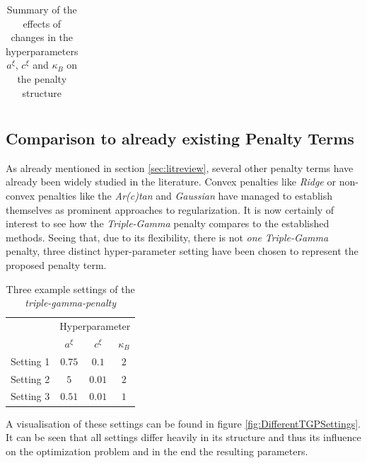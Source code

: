 \documentclass[12pt,a4paper]{article}
\begin{document}
\begin{landscape}
\begin{table}[h!]
\begin{tabular}{lcccccc}
\end{tabular}
\caption{Summary of the effects of changes in the hyperparameters $a^\xi$, $c^\xi$ and $\kappa_B$ on the penalty structure}
\label{tab:VariationsInHyperparameters}
\end{table}
\end{landscape}

\newpage

\subsection{Comparison to already existing Penalty Terms}\label{subsec:comparepenalties}

As already mentioned in section \ref{sec:litreview}, several other penalty terms have already been widely studied in the literature. Convex penalties like \textit{Ridge} \parencite{HoerlKennard1970a} or non-convex penalties like the \textit{Ar(c)tan} \parencite{WangZhu2016} and \textit{Gaussian} \parencite{JohnVettamWu2022} have managed to establish themselves as prominent approaches to regularization. It is now certainly of interest to see how the \textit{Triple-Gamma} penalty compares to the established methods. Seeing that, due to its flexibility, there is not \textit{one} \textit{Triple-Gamma} penalty, three distinct hyper-parameter setting have been chosen to represent the proposed penalty term. 

\begin{table}[h!]
\centering
\begin{tabular}{l|ccc}\toprule
		& \multicolumn{3}{c}{Hyperparameter} \\\cmidrule(r{4pt}){2-4}
     	& $a^\xi$  & $c^\xi$ & $\kappa_B$\\\midrule
Setting 1&	$0.75$	&	$0.1$ &	$2$\\
Setting 2&	$5$  &   $0.01$ & $2$\\
Setting 3&  $0.51$  & $0.01$&$1$\\ \bottomrule
\end{tabular}
\caption{Three example settings of the \textit{triple-gamma-penalty}}
\label{tab:TGSettings}
\end{table}

A visualisation of these settings can be found in figure \ref{fig:DifferentTGPSettings}. It can be seen that all settings differ heavily in its structure and thus its influence on the optimization problem and in the end the resulting parameters. 
\end{document}
